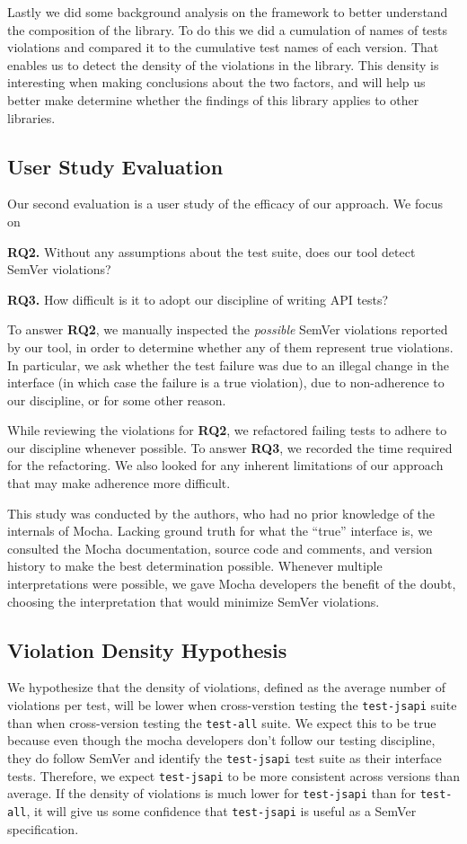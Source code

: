 Lastly we did some background analysis on the framework to better
understand the composition of the library. To do this we did a
cumulation of names of tests violations and compared it to the
cumulative test names of each version.  That enables us to detect the
density of the violations in the library. This density is interesting
when making conclusions about the two factors, and will help us better
make determine whether the findings of this library applies to other 
libraries.

\subsection{User Study Evaluation}
Our second evaluation is a user study of the efficacy of our
approach. We focus on 

{\bf RQ2.} Without any assumptions about the test suite, does our tool
detect SemVer violations?

{\bf RQ3.} How difficult is it to adopt our discipline of writing API
tests?

To answer {\bf RQ2}, we manually inspected the {\em possible\/} SemVer
violations reported by our tool, in order to determine whether any of
them represent true violations. In particular, we ask whether the test
failure was due to an illegal change in the interface (in which case
the failure is a true violation), due to non-adherence to our
discipline, or for some other reason.

While reviewing the violations for {\bf RQ2}, we refactored failing
tests to adhere to our discipline whenever possible. To answer {\bf
  RQ3}, we recorded the time required for the refactoring. We also
looked for any inherent limitations of our approach that may make
adherence more difficult.

This study was conducted by the authors, who had no prior knowledge of
the internals of Mocha. Lacking ground truth for what the ``true''
interface is, we consulted the Mocha documentation, source code and
comments, and version history to make the best determination
possible. Whenever multiple interpretations were possible, we gave
Mocha developers the benefit of the doubt, choosing the interpretation
that would minimize SemVer violations.

\subsection{Violation Density Hypothesis}
We hypothesize that the density of violations, defined as the average
number of violations per test, will be lower when cross-verstion
testing the {\tt test-jsapi} suite than when cross-version testing the
{\tt test-all} suite. We expect this to be true because even though
the mocha developers don't follow our testing discipline, they do
follow SemVer and identify the {\tt test-jsapi} test suite as their
interface tests. Therefore, we expect {\tt test-jsapi} to be more
consistent across versions than average. If the density of violations
is much lower for {\tt test-jsapi} than for {\tt test-all}, it will
give us some confidence that {\tt test-jsapi} is useful as a SemVer
specification.

